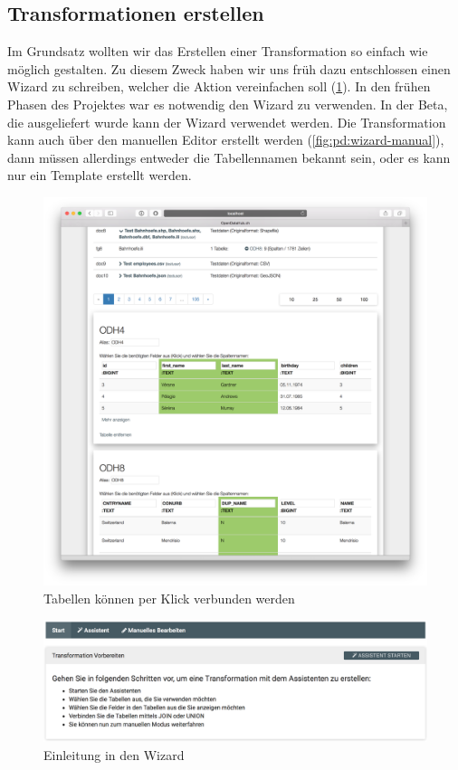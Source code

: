 \subsection{Transformationen erstellen}
Im Grundsatz wollten wir das Erstellen einer Transformation so einfach wie möglich gestalten. Zu diesem Zweck haben wir uns früh dazu entschlossen einen Wizard zu schreiben, welcher die Aktion vereinfachen soll (\cref{fig:pd:tables_per_click}). In den frühen Phasen des Projektes war es notwendig den Wizard zu verwenden. In der Beta, die ausgeliefert wurde kann der Wizard verwendet werden. Die Transformation kann auch über den manuellen Editor erstellt werden (\cref{fig:pd:wizard-manual}), dann müssen allerdings entweder die Tabellennamen bekannt sein, oder es kann nur ein Template erstellt werden.
\begin{figure}[H]
\centering
\includegraphics[width=\linewidth]{fig/odhql_wizard_early.png}
\caption{Tabellen können per Klick verbunden werden }
\label{fig:pd:tables_per_click}
\end{figure}
\begin{figure}[H]
\centering
\includegraphics[width=\linewidth]{fig/wizard-step-one.png}
\caption{Einleitung in den Wizard}
\label{fig:pd:wizard-step-one}
\end{figure}
